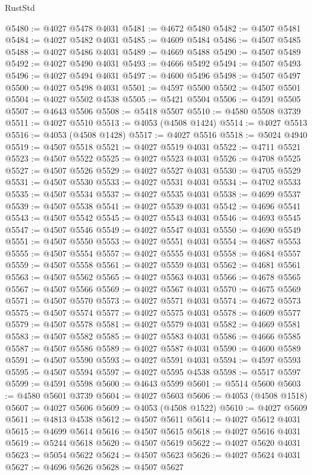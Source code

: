 \begin{lexlean}{RustStd}
\begin{coremodule}
@5480 := @4027 @5478 @4031
@5481 := @4672 @5480
@5482 := @4507 @5481
@5484 := @4027 @5482 @4031
@5485 := @4609 @5484
@5486 := @4507 @5485
@5488 := @4027 @5486 @4031
@5489 := @4669 @5488
@5490 := @4507 @5489
@5492 := @4027 @5490 @4031
@5493 := @4666 @5492
@5494 := @4507 @5493
@5496 := @4027 @5494 @4031
@5497 := @4600 @5496
@5498 := @4507 @5497
@5500 := @4027 @5498 @4031
@5501 := @4597 @5500
@5502 := @4507 @5501
@5504 := @4027 @5502 @4538
@5505 := @5421 @5504
@5506 := @4591 @5505
@5507 := @4643 @5506
@5508 := @5418 @5507
@5510 := @4580 @5508 @3739
@5511 := @4027 @5510
@5513 := @4053 (@4508 @1424)
@5514 := @4027 @5513
@5516 := @4053 (@4508 @1428)
@5517 := @4027 @5516
@5518 := @5024 @4940
@5519 := @4507 @5518
@5521 := @4027 @5519 @4031
@5522 := @4711 @5521
@5523 := @4507 @5522
@5525 := @4027 @5523 @4031
@5526 := @4708 @5525
@5527 := @4507 @5526
@5529 := @4027 @5527 @4031
@5530 := @4705 @5529
@5531 := @4507 @5530
@5533 := @4027 @5531 @4031
@5534 := @4702 @5533
@5535 := @4507 @5534
@5537 := @4027 @5535 @4031
@5538 := @4699 @5537
@5539 := @4507 @5538
@5541 := @4027 @5539 @4031
@5542 := @4696 @5541
@5543 := @4507 @5542
@5545 := @4027 @5543 @4031
@5546 := @4693 @5545
@5547 := @4507 @5546
@5549 := @4027 @5547 @4031
@5550 := @4690 @5549
@5551 := @4507 @5550
@5553 := @4027 @5551 @4031
@5554 := @4687 @5553
@5555 := @4507 @5554
@5557 := @4027 @5555 @4031
@5558 := @4684 @5557
@5559 := @4507 @5558
@5561 := @4027 @5559 @4031
@5562 := @4681 @5561
@5563 := @4507 @5562
@5565 := @4027 @5563 @4031
@5566 := @4678 @5565
@5567 := @4507 @5566
@5569 := @4027 @5567 @4031
@5570 := @4675 @5569
@5571 := @4507 @5570
@5573 := @4027 @5571 @4031
@5574 := @4672 @5573
@5575 := @4507 @5574
@5577 := @4027 @5575 @4031
@5578 := @4609 @5577
@5579 := @4507 @5578
@5581 := @4027 @5579 @4031
@5582 := @4669 @5581
@5583 := @4507 @5582
@5585 := @4027 @5583 @4031
@5586 := @4666 @5585
@5587 := @4507 @5586
@5589 := @4027 @5587 @4031
@5590 := @4600 @5589
@5591 := @4507 @5590
@5593 := @4027 @5591 @4031
@5594 := @4597 @5593
@5595 := @4507 @5594
@5597 := @4027 @5595 @4538
@5598 := @5517 @5597
@5599 := @4591 @5598
@5600 := @4643 @5599
@5601 := @5514 @5600
@5603 := @4580 @5601 @3739
@5604 := @4027 @5603
@5606 := @4053 (@4508 @1518)
@5607 := @4027 @5606
@5609 := @4053 (@4508 @1522)
@5610 := @4027 @5609
@5611 := @4813 @4538
@5612 := @4507 @5611
@5614 := @4027 @5612 @4031
@5615 := @4699 @5614
@5616 := @4507 @5615
@5618 := @4027 @5616 @4031
@5619 := @5244 @5618
@5620 := @4507 @5619
@5622 := @4027 @5620 @4031
@5623 := @5054 @5622
@5624 := @4507 @5623
@5626 := @4027 @5624 @4031
@5627 := @4696 @5626
@5628 := @4507 @5627

\end{coremodule}
\end{lexlean}
